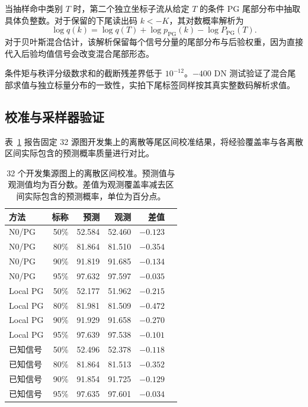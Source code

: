 \documentclass[10pt,twocolumn,journal]{IEEEtran}
\begin{document}
当抽样命中类别 $T$ 时，第二个独立坐标子流从给定 $T$ 的条件 PG 尾部分布中抽取具体负整数。对于保留的下尾读出码 $k<-K$，其对数概率解析为
\begin{equation}
\log q(k)=\log q(T)+\log p_{\mathrm{PG}}(k)-\log P_{\mathrm{PG}}(T).
\end{equation}
对于贝叶斯混合估计，该解析保留每个信号分量的尾部分布与后验权重，因为直接代入后验均值信号会改变混合尾部形态。

条件矩与秩评分级数求和的截断残差界低于 $10^{-12}$。$-400$ DN 测试验证了混合尾部求值与独立标量分布的一致性，实拍下尾标签同样按其真实整数码解析求值。

\subsection{校准与采样器验证}
表~\ref{tab:coverage} 报告固定 32 源图开发集上的离散等尾区间校准结果，将经验覆盖率与各离散区间实际包含的预测概率质量进行对比。

\begin{table}[t]
\centering\footnotesize
\caption{32 个开发集源图上的离散区间校准。预测值与观测值均为百分数。差值为观测覆盖率减去区间实际包含的预测概率，单位为百分点。}
\label{tab:coverage}
\setlength{\tabcolsep}{3pt}
\begin{tabular}{@{}lrrrrr@{}}
\toprule
方法 & 标称 & 预测 & 观测 & 差值\\
\midrule
N0/PG & 50\% & 52.584 & 52.460 & $-0.123$\\
N0/PG & 80\% & 81.864 & 81.510 & $-0.354$\\
N0/PG & 90\% & 91.819 & 91.685 & $-0.134$\\
N0/PG & 95\% & 97.632 & 97.597 & $-0.035$\\
Local PG & 50\% & 52.177 & 51.962 & $-0.215$\\
Local PG & 80\% & 81.981 & 81.509 & $-0.472$\\
Local PG & 90\% & 91.929 & 91.658 & $-0.270$\\
Local PG & 95\% & 97.639 & 97.538 & $-0.101$\\
已知信号 & 50\% & 52.496 & 52.378 & $-0.118$\\
已知信号 & 80\% & 81.864 & 81.513 & $-0.352$\\
已知信号 & 90\% & 91.854 & 91.725 & $-0.129$\\
已知信号 & 95\% & 97.635 & 97.601 & $-0.034$\\
\bottomrule
\end{tabular}
\end{table}
\end{document}
